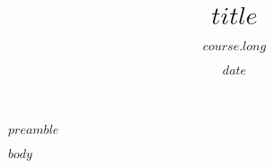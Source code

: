 \documentclass[12pt, addpoints, a4paper $if(answers)$, answers $endif$]{exam}
\title{\sffamily $title$}
\author{$course.long$}
\date{$date$}
\begin{document}
\maketitle
\thispagestyle{headandfoot}

\emph{$preamble$}

\begin{questions}
    $body$
\end{questions}
\end{document}
